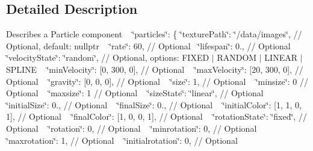 \subsection{Detailed Description}
Describes a Particle component ~\newline
 \char`\"{}particles\char`\"{}\+: \{ \char`\"{}texture\+Path\char`\"{}\+: \char`\"{}/data/images\char`\"{}, // Optional, default\+: nullptr ~\newline
 \char`\"{}rate\char`\"{}\+: 60, // Optional~\newline
 \char`\"{}lifespan\char`\"{}\+: 0., // Optional ~\newline
 \char`\"{}velocity\+State\char`\"{}\+: \char`\"{}random\char`\"{}, // Optional, options\+: F\+I\+X\+ED $\vert$ R\+A\+N\+D\+OM $\vert$ L\+I\+N\+E\+AR $\vert$ S\+P\+L\+I\+NE ~\newline
 \char`\"{}min\+Velocity\char`\"{}\+: \mbox{[}0, 300, 0\mbox{]}, // Optional ~\newline
 \char`\"{}max\+Velocity\char`\"{}\+: \mbox{[}20, 300, 0\mbox{]}, // Optional ~\newline
 \char`\"{}gravity\char`\"{}\+: \mbox{[}0, 0, 0\mbox{]}, // Optional ~\newline
 \char`\"{}size\char`\"{}\+: 1, // Optional ~\newline
 \char`\"{}minsize\char`\"{}\+: 0 // Optional ~\newline
 \char`\"{}maxsize\char`\"{}\+: 1 // Optional ~\newline
 \char`\"{}size\+State\char`\"{}\+: \char`\"{}linear\char`\"{}, // Optional ~\newline
 \char`\"{}initial\+Size\char`\"{}\+: 0., // Optional ~\newline
 \char`\"{}final\+Size\char`\"{}\+: 0., // Optional ~\newline
 \char`\"{}initial\+Color\char`\"{}\+: \mbox{[}1, 1, 0, 1\mbox{]}, // Optional ~\newline
 \char`\"{}final\+Color\char`\"{}\+: \mbox{[}1, 0, 0, 1\mbox{]}, // Optional ~\newline
 \char`\"{}rotation\+State\char`\"{}\+: \char`\"{}fixed\char`\"{}, // Optional ~\newline
 \char`\"{}rotation\char`\"{}\+: 0, // Optional ~\newline
 \char`\"{}minrotation\char`\"{}\+: 0, // Optional ~\newline
 \char`\"{}maxrotation\char`\"{}\+: 1, // Optional ~\newline
 \char`\"{}initialrotation\char`\"{}\+: 0, // Optional ~\newline
